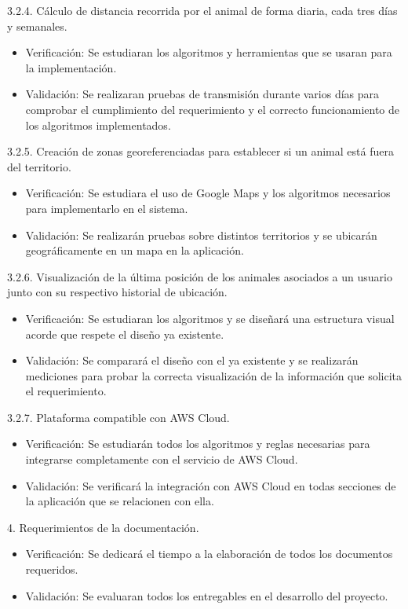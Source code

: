 \documentclass[11pt]{charter}
\begin{document}
3.2.4. Cálculo de distancia recorrida por el animal de forma diaria, cada tres días y semanales. 
\begin{itemize}
	\item Verificación: Se estudiaran los algoritmos y herramientas que se usaran para la implementación. 
	\item Validación: Se realizaran pruebas de transmisión durante varios días para comprobar el cumplimiento del requerimiento y el correcto funcionamiento de los algoritmos implementados. 
\end{itemize}

3.2.5. Creación de zonas georeferenciadas para establecer si un animal está fuera del territorio. 
\begin{itemize}
	\item Verificación: Se estudiara el uso de Google Maps y los algoritmos necesarios para implementarlo en el sistema. 
	\item Validación: Se realizarán pruebas sobre distintos territorios y se ubicarán geográficamente en un mapa en la aplicación. 
\end{itemize}

3.2.6. Visualización de la última posición de los animales asociados a un usuario junto con su respectivo historial de ubicación. 
\begin{itemize}
	\item Verificación: Se estudiaran los algoritmos y se diseñará una estructura visual acorde que respete el diseño ya existente. 
	\item Validación: Se comparará el diseño con el ya existente y se realizarán mediciones para probar la correcta visualización de la información que solicita el requerimiento. 
\end{itemize}

3.2.7. Plataforma compatible con AWS Cloud.
\begin{itemize}
	\item Verificación: Se estudiarán todos los algoritmos y reglas necesarias para integrarse completamente con el servicio de AWS Cloud. 
	\item Validación: Se verificará la integración con AWS Cloud en todas secciones de la aplicación que se relacionen con ella. 
\end{itemize}

4. Requerimientos de la documentación.
\begin{itemize}
	\item Verificación: Se dedicará el tiempo a la elaboración de todos los documentos requeridos.  
	\item Validación: Se evaluaran todos los entregables en el desarrollo del proyecto. 
\end{itemize}
\end{document}
